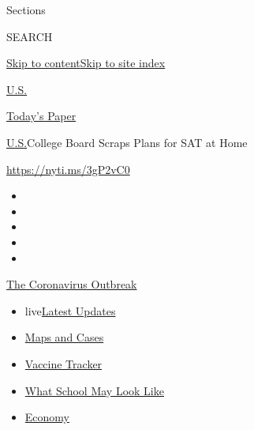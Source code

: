 Sections

SEARCH

\protect\hyperlink{site-content}{Skip to
content}\protect\hyperlink{site-index}{Skip to site index}

\href{https://www.nytimes.com/section/us}{U.S.}

\href{https://myaccount.nytimes.com/auth/login?response_type=cookie\&client_id=vi}{}

\href{https://www.nytimes.com/section/todayspaper}{Today's Paper}

\href{/section/us}{U.S.}\textbar{}College Board Scraps Plans for SAT at
Home

\url{https://nyti.ms/3gP2vC0}

\begin{itemize}
\item
\item
\item
\item
\item
\end{itemize}

\href{https://www.nytimes.com/news-event/coronavirus?action=click\&pgtype=Article\&state=default\&region=TOP_BANNER\&context=storylines_menu}{The
Coronavirus Outbreak}

\begin{itemize}
\tightlist
\item
  live\href{https://www.nytimes.com/2020/08/02/world/coronavirus-updates.html?action=click\&pgtype=Article\&state=default\&region=TOP_BANNER\&context=storylines_menu}{Latest
  Updates}
\item
  \href{https://www.nytimes.com/interactive/2020/us/coronavirus-us-cases.html?action=click\&pgtype=Article\&state=default\&region=TOP_BANNER\&context=storylines_menu}{Maps
  and Cases}
\item
  \href{https://www.nytimes.com/interactive/2020/science/coronavirus-vaccine-tracker.html?action=click\&pgtype=Article\&state=default\&region=TOP_BANNER\&context=storylines_menu}{Vaccine
  Tracker}
\item
  \href{https://www.nytimes.com/interactive/2020/07/29/us/schools-reopening-coronavirus.html?action=click\&pgtype=Article\&state=default\&region=TOP_BANNER\&context=storylines_menu}{What
  School May Look Like}
\item
  \href{https://www.nytimes.com/live/2020/07/31/business/stock-market-today-coronavirus?action=click\&pgtype=Article\&state=default\&region=TOP_BANNER\&context=storylines_menu}{Economy}
\end{itemize}

